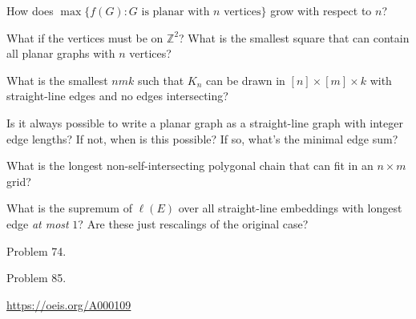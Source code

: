 \documentclass{article}
\begin{document}
\begin{related}
  \item How does $\max\{f(G) : G \text{ is planar with } n \text{ vertices}\}$ grow with respect to $n$?
  \item What if the vertices must be on $\mathbb Z^2$? What is the smallest
    square that can contain all planar graphs with $n$ vertices?
  \item What is the smallest $nmk$ such that $K_n$ can be drawn in
    $[n] \times [m] \times k$ with straight-line edges and no edges intersecting?
  \item Is it always possible to write a planar graph as a straight-line graph
    with integer edge lengths? If not, when is this possible? If so, what's the
    minimal edge sum?
  \item What is the longest non-self-intersecting polygonal chain that can fit
    in an $n \times m$ grid?
  \item What is the supremum of $\ell(E)$ over all  straight-line embeddings with longest edge \textit{at most} $1$? Are these just rescalings of the original case?
\end{related}

\begin{references}
  \item Problem 74.
  \item Problem 85.
  \item \url{https://oeis.org/A000109}
\end{references}
\end{document}
